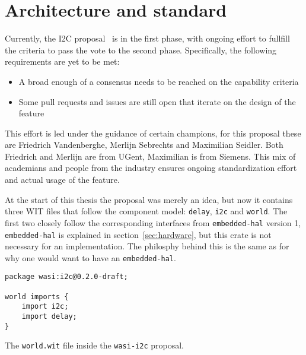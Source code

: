 \chapter{Architecture and standard}
\label{chap:architecture}


Currently, the \gls{I2C} proposal~\cite{gh:i2c} is in the first phase, with ongoing effort to fullfill the criteria to pass the vote to the second phase. Specifically, the following requirements are yet to be met:

\begin{itemize}
    \item A broad enough of a consensus needs to be reached on the capability criteria
    \item Some pull requests and issues are still open that iterate on the design of the feature
\end{itemize}

This effort is led under the guidance of certain champions, for this proposal these are Friedrich Vandenberghe, Merlijn Sebrechts and Maximilian Seidler. Both Friedrich and Merlijn are from UGent, Maximilian is from Siemens. This mix of academians and people from the industry ensures ongoing standardization effort and actual usage of the feature.

At the start of this thesis the proposal was merely an idea, but now it contains three \gls{WIT} files that follow the component model: \texttt{delay}, \texttt{i2c} and \texttt{world}. The first two closely follow the corresponding interfaces from \texttt{embedded-hal} version 1, \texttt{embedded-hal} is explained in section~\ref{sec:hardware}, but this crate is not necessary for an implementation. The philosphy behind this is the same as for why one would want to have an \texttt{embedded-hal}.



\begin{listing}[h]
\begin{verbatim}
package wasi:i2c@0.2.0-draft;

world imports {
    import i2c;
    import delay;
}
\end{verbatim}
\caption{The \texttt{world.wit} file inside the \texttt{wasi-i2c} proposal.}
\label{code:world}
\end{listing}

